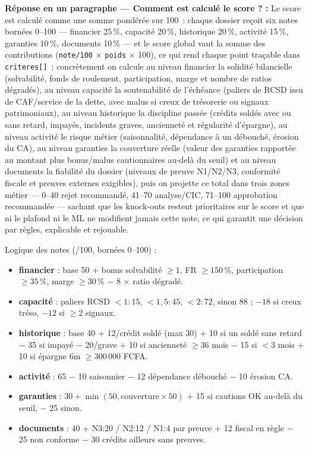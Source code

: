 \documentclass[11pt,a4paper]{article}
\begin{document}
\begin{encadrevert}
\textbf{Réponse en un paragraphe --- \og Comment est calculé le score ? \fg{} :} Le score est calculé comme une somme pondérée sur 100~: chaque dossier reçoit six notes bornées 0--100 --- financier 25\,\%, capacité 20\,\%, historique 20\,\%, activité 15\,\%, garanties 10\,\%, documents 10\,\% --- et le score global vaut la somme des contributions (\texttt{note/100} $\times$ \texttt{poids} $\times$ 100), ce qui rend chaque point traçable dans \texttt{criteres[]}~; concrètement on calcule au niveau financier la solidité bilancielle (solvabilité, fonds de roulement, participation, marge et nombre de ratios dégradés), au niveau capacité la soutenabilité de l'échéance (paliers de RCSD issu de CAF/service de la dette, avec malus si creux de trésorerie ou signaux patrimoniaux), au niveau historique la discipline passée (crédits soldés avec ou sans retard, impayés, incidents graves, ancienneté et régularité d'épargne), au niveau activité le risque métier (saisonnalité, dépendance à un débouché, érosion du CA), au niveau garanties la couverture réelle (valeur des garanties rapportée au montant plus bonus/malus cautionnaires au-delà du seuil) et au niveau documents la fiabilité du dossier (niveaux de preuve N1/N2/N3, conformité fiscale et preuves externes exigibles), puis on projette ce total dans trois zones métier --- 0--40 rejet recommandé, 41--70 analyse/CIC, 71--100 approbation recommandée --- sachant que les knock-outs restent prioritaires sur le score et que ni le plafond ni le ML ne modifient jamais cette note, ce qui garantit une décision par règles, explicable et rejouable.
\end{encadrevert}

Logique des notes (/100, bornées 0--100) :
\begin{itemize}
  \item \textbf{financier} : base 50 + bonus solvabilité $\geq 1$, FR $\geq 150$\,\%, participation $\geq 35$\,\%, marge $\geq 30$\,\% $-$ 8 $\times$ ratio dégradé.
  \item \textbf{capacité} : paliers RCSD $<1 : 15$, $<1{,}5 : 45$, $<2 : 72$, sinon 88 ; $-18$ si creux tréso, $-12$ si $\geq 2$ signaux.
  \item \textbf{historique} : base 40 + 12/crédit soldé (max 30) + 10 si un soldé sans retard $-$ 35 si impayé $-$ 20/grave + 10 si ancienneté $\geq 36$ mois $-$ 15 si $<3$ mois + 10 si épargne 6m $\geq 300\,000$ FCFA.
  \item \textbf{activité} : 65 $-$ 10 saisonnier $-$ 12 dépendance débouché $-$ 10 érosion CA.
  \item \textbf{garanties} : $30+\min(50, \text{couverture}\times 50)$ + 15 si cautions OK au-delà du seuil, $-$ 25 sinon.
  \item \textbf{documents} : 40 + N3:20 / N2:12 / N1:4 par preuve + 12 fiscal en règle $-$ 25 non conforme $-$ 30 crédits ailleurs sans preuves.
\end{itemize}
\end{document}
